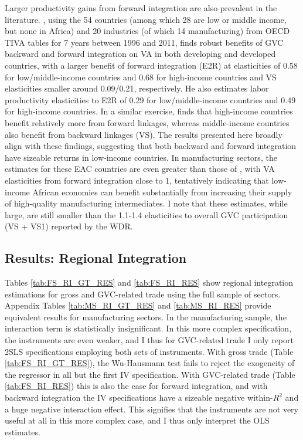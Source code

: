 \documentclass[a4paper]{article}
\begin{document}
Larger productivity gains from forward integration are also prevalent in the literature. \citet{Kummritz20161}, using the 54 countries (among which 28 are low or middle income, but none in Africa) and 20 industries (of which 14 manufacturing) from OECD TIVA tables for 7 years between 1996 and 2011, finds robust benefits of GVC backward and forward integration on VA in both developing and developed countries, with a larger benefit of forward integration (E2R) at elasticities of 0.58 for low/middle-income countries and 0.68 for high-income countries and VS elasticities smaller around 0.09/0.21, respectively. He also estimates labor productivity elasticities to E2R of 0.29 for low/middle-income countries and 0.49 for high-income countries. In a similar exercise, \citet{kummritz2015global} finds that high-income countries benefit relatively more from forward linkages, whereas middle-income countries also benefit from backward linkages (VS). The results presented here broadly align with these findings, suggesting that both backward and forward integration have sizeable returns in low-income countries. In manufacturing sectors, the estimates for these EAC countries are even greater than those of \citet{Kummritz20161}, with VA elasticities from forward integration close to 1, tentatively indicating that low-income African economies can benefit substantially from increasing their supply of high-quality manufacturing intermediates. I note that these estimates, while large, are still smaller than the 1.1-1.4 elasticities to overall GVC participation (VS + VS1) reported by the WDR. 
 


\subsection{Results: Regional Integration}

Tables \ref{tab:FS_RI_GT_RES} and \ref{tab:FS_RI_RES} show regional integration estimations for gross and GVC-related trade using the full sample of sectors. Appendix Tables \ref{tab:MS_RI_GT_RES} and \ref{tab:MS_RI_RES} provide equivalent results for manufacturing sectors. In the manufacturing sample, the interaction term is statistically insignificant. In this more complex specification, the instruments are even weaker, and I thus for GVC-related trade I only report 2SLS specifications employing both sets of instruments. With gross trade (Table \ref{tab:FS_RI_GT_RES}), the Wu-Hausmann test fails to reject the exogeneity of the regressor in all but the first IV specification. With GVC-related trade (Table \ref{tab:FS_RI_RES}) this is also the case for forward integration, and with backward integration the IV specifications have a sizeable negative within-$R^2$ and a huge negative interaction effect. This signifies that the instruments are not very useful at all in this more complex case, and I thus only interpret the OLS estimates. \newpage 
\end{document}
